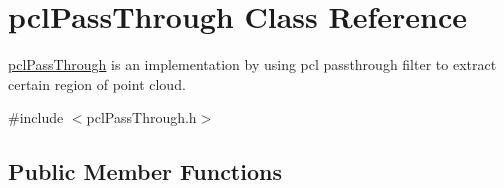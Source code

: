 \hypertarget{classpclPassThrough}{}\section{pcl\+Pass\+Through Class Reference}
\label{classpclPassThrough}


\hyperlink{classpclPassThrough}{pcl\+Pass\+Through} is an implementation by using pcl passthrough filter to extract certain region of point cloud.
\begin{DoxyItemize}
\item 
\end{DoxyItemize} 




{\ttfamily \#include $<$pcl\+Pass\+Through.\+h$>$}

\subsection*{Public Member Functions}
